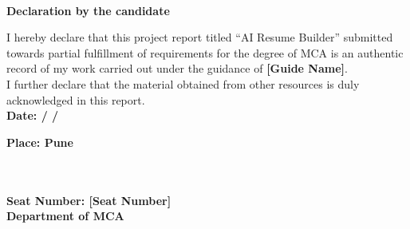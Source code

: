 \begin{center}
\thispagestyle{plain}
\vspace{1.8cm}
{\LARGE \textbf{\vspace{1.8cm}\\Declaration by the candidate}}\\[0.5cm]
\end{center}
\linespread{1.13}
\large{I hereby declare that this project report titled ``AI Resume Builder'' submitted towards partial fulfillment of requirements
for the degree of MCA is an authentic record of my work carried out under the guidance of \textbf{[Guide Name]}.
\\
I further declare that the material obtained from other resources is duly acknowledged in this report.
}\\[1.5cm]
\large{\textbf{Date:   \hspace*{0.1cm}/ \hspace*{0.1cm}/}}\\
\vspace*{0.8cm}
\large{\textbf{Place: Pune}\\
\begin{flushright}
{
\textbf{\vspace{2.2cm}\\[Student Name]}
\textbf{\vspace{.1cm}\\Seat Number: [Seat Number]}
\textbf{\vspace{.1cm}\\Department of MCA}
}
\end{flushright}
}
